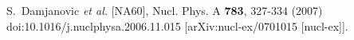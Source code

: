 
S.~Damjanovic \textit{et al.} [NA60],
Nucl. Phys. A \textbf{783}, 327-334 (2007)
doi:10.1016/j.nuclphysa.2006.11.015
[arXiv:nucl-ex/0701015 [nucl-ex]].
